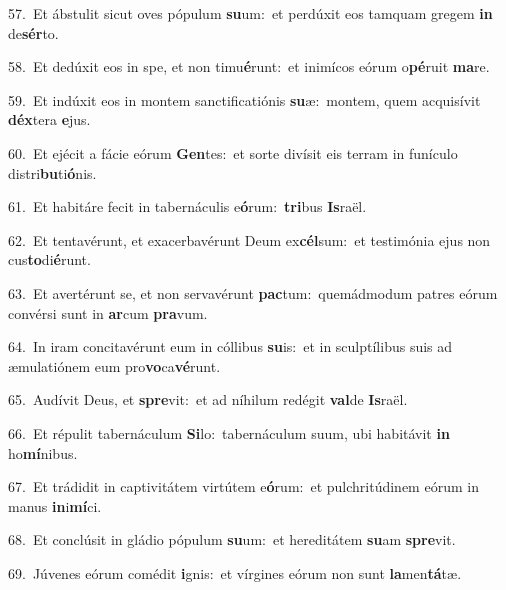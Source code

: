 {\numbfont\textcolor{\numbcolor}{57.}}~Et ábstulit sicut oves pópulum \textbf{su}\-um:~\star et perdúxit eos tamquam gregem \textbf{in} de\-\textbf{sér}\-to.\par
{\numbfont\textcolor{\numbcolor}{58.}}~Et dedúxit eos in spe, et non timu\-\textbf{é}\-runt:~\star et inimícos eórum o\-\textbf{pé}\-ruit \textbf{ma}\-re.\par
{\numbfont\textcolor{\numbcolor}{59.}}~Et indúxit eos in montem sanctificatiónis \textbf{su}\-æ:~\star montem, quem acquisívit \textbf{déx}\-tera \textbf{e}\-jus.\par
{\numbfont\textcolor{\numbcolor}{60.}}~Et ejécit a fácie eórum \textbf{Gen}\-tes:~\star et sorte divísit eis terram in funículo distri\-\textbf{bu}\-ti\-\textbf{ó}\-nis.\par
{\numbfont\textcolor{\numbcolor}{61.}}~Et habitáre fecit in tabernáculis e\-\textbf{ó}\-rum:~\star \textbf{tri}\-bus \textbf{Is}\-raël.\par
{\numbfont\textcolor{\numbcolor}{62.}}~Et tentavérunt, et exacerbavérunt Deum ex\-\textbf{cél}\-sum:~\star et testimónia ejus non cus\-\textbf{to}\-di\-\textbf{é}\-runt.\par
{\numbfont\textcolor{\numbcolor}{63.}}~Et avertérunt se, et non servavérunt \textbf{pac}\-tum:~\star quemádmodum patres eórum convérsi sunt in \textbf{ar}\-cum \textbf{pra}\-vum.\par
{\numbfont\textcolor{\numbcolor}{64.}}~In iram concitavérunt eum in cóllibus \textbf{su}\-is:~\star et in sculptílibus suis ad æmulatiónem eum pro\-\textbf{vo}\-ca\-\textbf{vé}\-runt.\par
{\numbfont\textcolor{\numbcolor}{65.}}~Audívit Deus, et \textbf{spre}\-vit:~\star et ad níhilum redégit \textbf{val}\-de \textbf{Is}\-raël.\par
{\numbfont\textcolor{\numbcolor}{66.}}~Et répulit tabernáculum \textbf{Si}\-lo:~\star tabernáculum suum, ubi habitávit \textbf{in} ho\-\textbf{mí}\-nibus.\par
{\numbfont\textcolor{\numbcolor}{67.}}~Et trádidit in captivitátem virtútem e\-\textbf{ó}\-rum:~\star et pulchritúdinem eórum in manus \textbf{in}\-i\-\textbf{mí}\-ci.\par
{\numbfont\textcolor{\numbcolor}{68.}}~Et conclúsit in gládio pópulum \textbf{su}\-um:~\star et hereditátem \textbf{su}\-am \textbf{spre}\-vit.\par
{\numbfont\textcolor{\numbcolor}{69.}}~Júvenes eórum comédit \textbf{i}\-gnis:~\star et vírgines eórum non sunt \textbf{la}\-men\-\textbf{tá}\-tæ.\par

